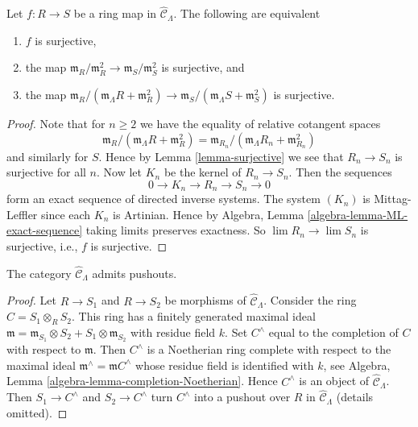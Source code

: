 \begin{lemma}
\label{lemma-surjective-cotangent-space}
Let $f: R \to S$ be a ring map in $\widehat{\mathcal{C}}_\Lambda$.
The following are equivalent
\begin{enumerate}
\item $f$ is surjective,
\item the map
$\mathfrak m_R/\mathfrak m_R^2 \to \mathfrak m_S/\mathfrak m_S^2$
is surjective, and
\item the map
$\mathfrak m_R/(\mathfrak m_\Lambda R + \mathfrak m_R^2) \to
\mathfrak m_S/(\mathfrak m_\Lambda S + \mathfrak m_S^2)$
is surjective.
\end{enumerate}
\end{lemma}

\begin{proof}
Note that for $n \geq 2$ we have the equality of relative cotangent spaces
$$
\mathfrak m_R/(\mathfrak m_\Lambda R + \mathfrak m_R^2)
=
\mathfrak m_{R_n}/(\mathfrak m_\Lambda R_n + \mathfrak m_{R_n}^2)
$$
and similarly for $S$. Hence by
Lemma \ref{lemma-surjective}
we see that $R_n \to S_n$ is surjective for all $n$.
Now let $K_n$ be the kernel of $R_n \to S_n$.  Then the sequences 
$$
0 \to K_n \to R_n \to S_n \to 0
$$
form an exact sequence of directed inverse systems. The system $(K_n)$ is 
Mittag-Leffler since each $K_n$ is Artinian. Hence by
Algebra, Lemma \ref{algebra-lemma-ML-exact-sequence}
taking limits preserves exactness. So
$\lim R_n \to \lim S_n$ is surjective, i.e., $f$ is surjective.
\end{proof}

\begin{lemma}
\label{lemma-CLambdahat-pushouts}
The category $\widehat{\mathcal{C}}_\Lambda$ admits pushouts.
\end{lemma}

\begin{proof}
Let $R \to S_1$ and $R \to S_2$ be morphisms of
$\widehat{\mathcal{C}}_\Lambda$. Consider the ring
$C = S_1 \otimes_R S_2$.
This ring has a finitely generated maximal ideal
$\mathfrak m = \mathfrak m_{S_1} \otimes S_2 +
S_1 \otimes \mathfrak m_{S_2}$ with residue field $k$.
Set $C^\wedge$ equal to the completion of $C$ with respect to $\mathfrak m$.
Then $C^\wedge$ is a Noetherian ring complete with respect to
the maximal ideal $\mathfrak m^\wedge = \mathfrak mC^\wedge$
whose residue field is identified with $k$, see
Algebra, Lemma \ref{algebra-lemma-completion-Noetherian}.
Hence $C^\wedge$ is an object of $\widehat{\mathcal{C}}_\Lambda$.
Then $S_1 \to C^\wedge$ and $S_2 \to C^\wedge$ turn $C^\wedge$
into a pushout over $R$ in $\widehat{\mathcal{C}}_\Lambda$ (details omitted).
\end{proof}

